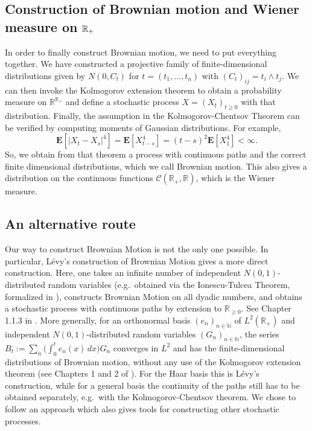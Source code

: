 \documentclass[lean]{Draft}
\begin{document}
\subsection{Construction of Brownian motion and Wiener measure on $\mathbb{R}_+$}

In order to finally construct Brownian motion, we need to put everything together.
We have constructed a projective family of finite-dimensional distributions given by $N(0,C_t)$ for $t = (t_1,...,t_n)$ with $(C_t)_{ij} = t_i \wedge t_j$.
We can then invoke the Kolmogorov extension theorem to obtain a probability measure on $\mathbb{R}^{\mathbb{R}_+}$ and define a stochastic process $X = (X_t)_{t\geq 0}$ with that distribution.
Finally, the assumption in the Kolmogorov-Chentsov Theorem can be verified by computing moments of Gaussian distributions.
For example,
\[ \mathbf E[|X_t - X_s|^4] = \mathbf E[X_{t-s}^4] = (t-s)^2 \mathbf E[X_{1}^4] < \infty.\]
So, we obtain from that theorem a process with continuous paths and the correct finite dimensional distributions, which we call Brownian motion.
This also gives a distribution on the continuous functions $\mathcal C(\mathbb R_+, \mathbb R)$, which is the Wiener measure.

\subsection{An alternative route}
Our way to construct Brownian Motion is not the only one possible. In particular, Lévy's construction of Brownian Motion gives a more direct construction. Here, one takes an infinite number of independent $N(0,1)$-distributed random variables (e.g.\ obtained via the Ionescu-Tulcea Theorem, formalized in \cite{marion2025ionescu}), constructs Brownian Motion on all dyadic numbers, and obtains a stochastic process with continuous paths by extension to $\mathbb R_{\geq 0}$. See Chapter 1.1.3 in \cite{morters2010brownian}.
More generally, for an orthonormal basis $(e_n)_{n \in \mathbb N}$ of $L^2(\mathbb R_+)$ and independent $N(0,1)$-distributed random variables $(G_n)_{n \in \mathbb N}$, the series $B_t := \sum_{n} \big(\int_0^t e_n(x)\,dx\big) G_n$ converges in $L^2$ and has the finite-dimensional distributions of Brownian motion, without any use of the Kolmogorov extension theorem (see Chapters 1 and 2 of \cite{LeGall2016}). For the Haar basis this is Lévy's construction, while for a general basis the continuity of the paths still has to be obtained separately, e.g.\ with the Kolmogorov-Chentsov theorem.
We chose to follow an approach which also gives tools for constructing other stochastic processes.
\end{document}

